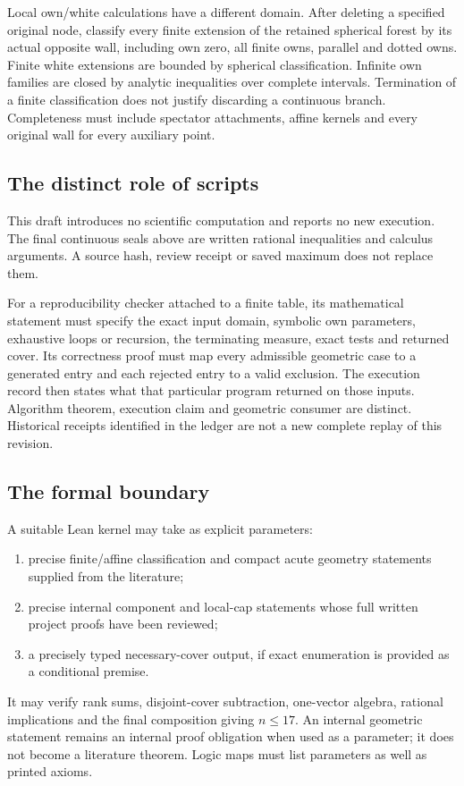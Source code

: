 \documentclass[11pt]{article}
\theoremstyle{definition}
\theoremstyle{remark}
\begin{document}
Local own/white calculations have a different domain.
After deleting a specified original node, classify every
finite extension of the retained spherical forest by its
actual opposite wall, including own zero, all finite owns,
parallel and dotted owns. Finite white extensions are bounded
by spherical classification. Infinite own families are closed
by analytic inequalities over complete intervals.
Termination of a finite classification does not justify
discarding a continuous branch. Completeness must include
spectator attachments, affine kernels and every original
wall for every auxiliary point.

\subsection{The distinct role of scripts}
This draft introduces no scientific computation and reports
no new execution. The final continuous seals above are
written rational inequalities and calculus arguments.
A source hash, review receipt or saved maximum does not
replace them.

For a reproducibility checker attached to a finite table,
its mathematical statement must specify the exact input
domain, symbolic own parameters, exhaustive loops or recursion,
the terminating measure, exact tests and returned cover.
Its correctness proof must map every admissible geometric
case to a generated entry and each rejected entry to a
valid exclusion. The execution record then states what
that particular program returned on those inputs.
Algorithm theorem, execution claim and geometric consumer
are distinct. Historical receipts identified in the ledger
are not a new complete replay of this revision.

\subsection{The formal boundary}
A suitable Lean kernel may take as explicit parameters:
\begin{enumerate}
\item precise finite/affine classification and compact acute
 geometry statements supplied from the literature;
\item precise internal component and local-cap statements whose
 full written project proofs have been reviewed;
\item a precisely typed necessary-cover output, if exact
 enumeration is provided as a conditional premise.
\end{enumerate}
It may verify rank sums, disjoint-cover subtraction,
one-vector algebra, rational implications and the final
composition giving \(n\leq17\).
An internal geometric statement remains an internal proof
obligation when used as a parameter; it does not become
a literature theorem. Logic maps must list parameters as
well as printed axioms.
\end{document}
